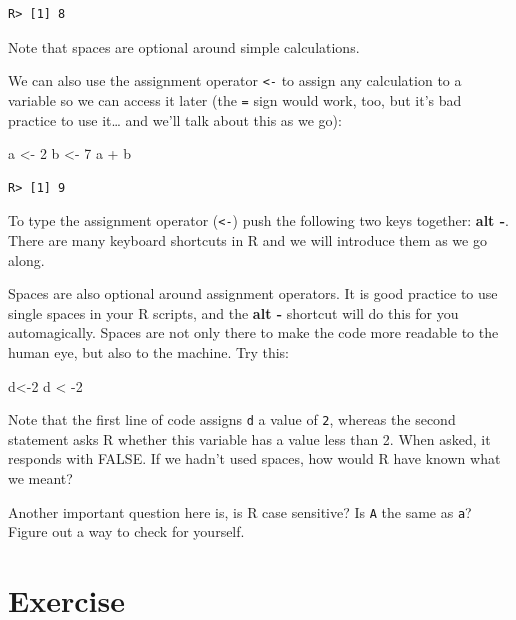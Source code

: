 \documentclass[
]{book}
\newenvironment{Shaded}{\begin{snugshade}}{\end{snugshade}}
\newcommand{\DecValTok}[1]{\textcolor[rgb]{0.00,0.00,0.81}{#1}}
\newcommand{\NormalTok}[1]{#1}
\newcommand{\OtherTok}[1]{\textcolor[rgb]{0.56,0.35,0.01}{#1}}
\newcommand{\SpecialCharTok}[1]{\textcolor[rgb]{0.00,0.00,0.00}{#1}}
\begin{document}
\begin{verbatim}
R> [1] 8
\end{verbatim}

Note that spaces are optional around simple calculations.

We can also use the assignment operator \texttt{\textless{}-} to assign any calculation to a variable so we can access it later (the \texttt{=} sign would work, too, but it's bad practice to use it\ldots{} and we'll talk about this as we go):

\begin{Shaded}
\begin{Highlighting}[]
\NormalTok{a }\OtherTok{\textless{}{-}} \DecValTok{2}
\NormalTok{b }\OtherTok{\textless{}{-}} \DecValTok{7}
\NormalTok{a }\SpecialCharTok{+}\NormalTok{ b}
\end{Highlighting}
\end{Shaded}

\begin{verbatim}
R> [1] 9
\end{verbatim}

To type the assignment operator (\texttt{\textless{}-}) push the following two keys together: \textbf{alt -}. There are many keyboard shortcuts in R and we will introduce them as we go along.

Spaces are also optional around assignment operators. It is good practice to use single spaces in your R scripts, and the \textbf{alt -} shortcut will do this for you automagically. Spaces are not only there to make the code more readable to the human eye, but also to the machine. Try this:

\begin{Shaded}
\begin{Highlighting}[]
\NormalTok{d}\OtherTok{\textless{}{-}}\DecValTok{2}
\NormalTok{d }\SpecialCharTok{\textless{}} \SpecialCharTok{{-}}\DecValTok{2}
\end{Highlighting}
\end{Shaded}

Note that the first line of code assigns \texttt{d} a value of \texttt{2}, whereas the second statement asks R whether this variable has a value less than 2. When asked, it responds with FALSE. If we hadn't used spaces, how would R have known what we meant?

Another important question here is, is R case sensitive? Is \texttt{A} the same as \texttt{a}? Figure out a way to check for yourself.

\hypertarget{exercise}{%
\section{Exercise}\label{exercise}}
\end{document}
